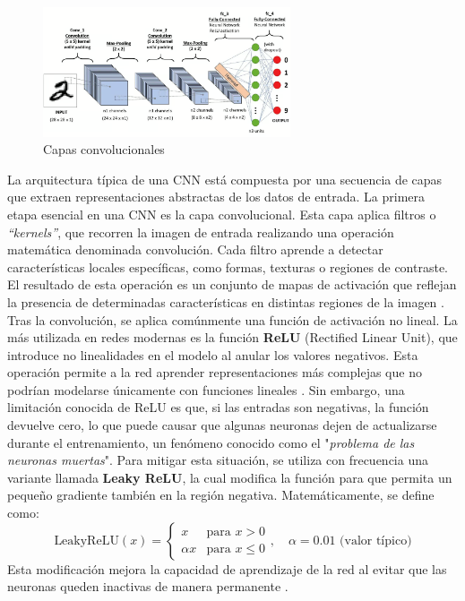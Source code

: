 \documentclass[12pt]{article} %
\begin{document}
\begin{figure}[!ht]
    \centering
    \includegraphics[width=0.65\textwidth]{CNN.png}
    \caption{Capas convolucionales \cite{datacamp_cnn}}
    \label{fig:capas_convolucionales}
\end{figure}
La arquitectura típica de una CNN está compuesta por una secuencia de capas que extraen representaciones abstractas de los datos de entrada. La primera etapa esencial en una CNN es la capa convolucional. Esta capa aplica filtros o \textit{“kernels”}, que recorren la imagen de entrada realizando una operación matemática denominada convolución. Cada filtro aprende a detectar características locales específicas, como formas, texturas o regiones de contraste. El resultado de esta operación es un conjunto de mapas de activación que reflejan la presencia de determinadas características en distintas regiones de la imagen \cite{lecun1998gradient}. \\

Tras la convolución, se aplica comúnmente una función de activación no lineal. La más utilizada en redes modernas es la función \textbf{ReLU} (Rectified Linear Unit), que introduce no linealidades en el modelo al anular los valores negativos. Esta operación permite a la red aprender representaciones más complejas que no podrían modelarse únicamente con funciones lineales \cite{nair2010rectified}. Sin embargo, una limitación conocida de ReLU es que, si las entradas son negativas, la función devuelve cero, lo que puede causar que algunas neuronas dejen de actualizarse durante el entrenamiento, un fenómeno conocido como el "\textit{problema de las neuronas muertas}". Para mitigar esta situación, se utiliza con frecuencia una variante llamada \textbf{Leaky ReLU}, la cual modifica la función para que permita un pequeño gradiente también en la región negativa. Matemáticamente, se define como: \[
\text{LeakyReLU}(x) = 
\begin{cases} 
x & \text{para } x > 0 \\
\alpha x & \text{para } x \le 0 
\end{cases}, \quad
\alpha = 0.01 \text{ (valor típico)}
\] Esta modificación mejora la capacidad de aprendizaje de la red al evitar que las neuronas queden inactivas de manera permanente \cite{maas2013rectifier}. \\
\end{document}
